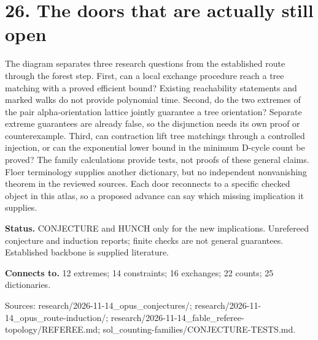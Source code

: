 \documentclass[10pt,a4paper]{amsart}
\begin{document}
\section*{26. The doors that are actually still open}
\begin{center}\begin{minipage}{.86\textwidth}\centering
{}
\end{minipage}\end{center}
The diagram separates three research questions from the established route through the forest step. First, can a local exchange procedure reach a tree matching with a proved efficient bound? Existing reachability statements and marked walks do not provide polynomial time. Second, do the two extremes of the pair alpha-orientation lattice jointly guarantee a tree orientation? Separate extreme guarantees are already false, so the disjunction needs its own proof or counterexample. Third, can contraction lift tree matchings through a controlled injection, or can the exponential lower bound in the minimum D-cycle count be proved? The family calculations provide tests, not proofs of these general claims. Floer terminology supplies another dictionary, but no independent nonvanishing theorem in the reviewed sources. Each door reconnects to a specific checked object in this atlas, so a proposed advance can say which missing implication it supplies.

\textbf{Status.} CONJECTURE and HUNCH only for the new implications. Unrefereed conjecture and induction reports; finite checks are not general guarantees. Established backbone is supplied literature.

\textbf{Connects to.} 12 extremes; 14 constraints; 16 exchanges; 22 counts; 25 dictionaries.

{\footnotesize\raggedright Sources: research/\allowbreak{}2026-11-14\_opus\_conjectures/\allowbreak{};\allowbreak{} research/\allowbreak{}2026-11-14\_opus\_route-induction/\allowbreak{};\allowbreak{} research/\allowbreak{}2026-11-14\_fable\_referee-topology/\allowbreak{}REFEREE.md;\allowbreak{} sol\_counting-families/\allowbreak{}CONJECTURE-TESTS.md.\par}
\end{document}
